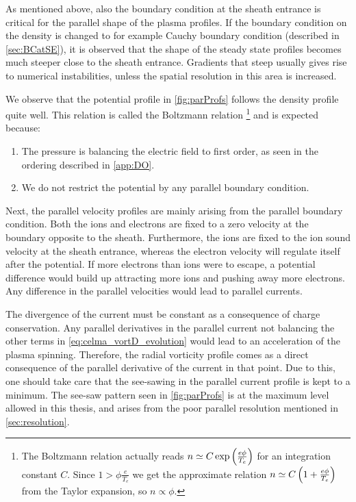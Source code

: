 As mentioned above, also the boundary condition at the sheath entrance is critical for the parallel shape of the plasma profiles.
If the boundary condition on the density is changed to for example Cauchy boundary condition (described in \cref{sec:BCatSE}), it is observed that the shape of the steady state profiles becomes much steeper close to the sheath entrance.
Gradients that steep usually gives rise to numerical instabilities, unless the spatial resolution in this area is increased.

We observe that the potential profile in \cref{fig:parProfs} follows the density profile quite well.
This relation is called the Boltzmann relation%
\footnote{The Boltzmann relation actually reads $n \simeq C\exp\left(\frac{e\phi}{T_e}\right)$ for an integration constant $C$.
    Since $1 > \phi\frac{e}{T_e}$ we get the approximate relation $n \simeq C\left(1+\frac{e\phi}{T_e}\right)$ from the Taylor expansion, so $n\propto\phi$.
}
%
and is expected because:
%
\begin{enumerate}[noitemsep]
        \item The pressure is balancing the electric field to first order, as seen in the ordering described in \ref{app:DO}.
        \item We do not restrict the potential by any parallel boundary condition.
\end{enumerate}
%

Next, the parallel velocity profiles are mainly arising from the parallel boundary condition.
Both the ions and electrons are fixed to a zero velocity at the boundary opposite to the sheath.
Furthermore, the ions are fixed to the ion sound velocity at the sheath entrance, whereas the electron velocity will regulate itself after the potential.
If more electrons than ions were to escape, a potential difference would build up attracting more ions and pushing away more electrons.
%
%
Any difference in the parallel velocities would lead to parallel currents.

The divergence of the current must be constant as a consequence of charge conservation.
Any parallel derivatives in the parallel current not balancing the other terms in \cref{eq:celma_vortD_evolution} would lead to an acceleration of the plasma spinning.
Therefore, the radial vorticity profile comes as a direct consequence of the parallel derivative of the current in that point.
Due to this, one should take care that the see-sawing in the parallel current profile is kept to a minimum.
The see-saw pattern seen in \cref{fig:parProfs} is at the maximum level allowed in this thesis, and arises from the poor parallel resolution mentioned in \ref{sec:resolution}.

